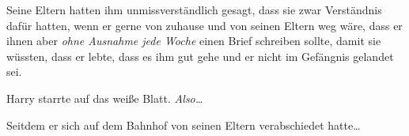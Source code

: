 Seine Eltern hatten ihm unmissverständlich gesagt, dass sie zwar Verständnis dafür hatten, wenn er gerne von zuhause und von seinen Eltern weg wäre, dass er ihnen aber \emph{ohne Ausnahme jede Woche} einen Brief schreiben sollte, damit sie wüssten, dass er lebte, dass es ihm gut gehe und er nicht im Gefängnis gelandet sei.

Harry starrte auf das weiße Blatt. \emph{Also…}

Seitdem er sich auf dem Bahnhof von seinen Eltern verabschiedet hatte…

